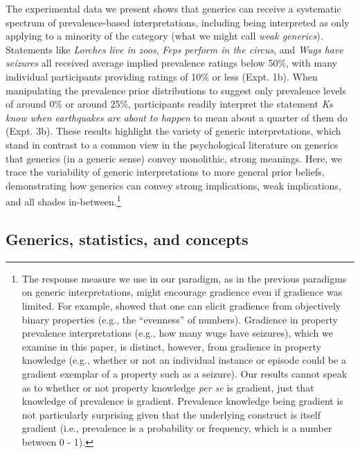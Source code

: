 \documentclass[floatsintext,man]{apa6}
\let\rmarkdownfootnote\footnote%
\def\footnote{\protect\rmarkdownfootnote}
\begin{document}
%
The experimental data we present shows that generics can receive a systematic spectrum of prevalence-based interpretations, including being interpreted as only applying to a minority of the category (what we might call \emph{weak generics}). 
Statements like \emph{Lorches live in zoos}, \emph{Feps perform in the circus}, and \emph{Wugs have seizures} all received average implied prevalence ratings below 50\%, with many individual participants providing ratings of 10\% or less (Expt. 1b).
When manipulating the prevalence prior distributions to suggest only prevalence levels of around 0\% or around 25\%, participants readily interpret the statement \emph{Ks know when earthquakes are about to happen} to mean about a quarter of them do (Expt. 3b).
These results highlight the variety of generic interpretations, which stand in contrast to a common view in the psychological literature on generics that generics (in a generic sense) convey monolithic, strong meanings.
Here, we trace the variability of generic interpretations to more general prior beliefs, demonstrating how generics can convey strong implications, weak implications, and all shades in-between.\footnote{
The response measure we use in our paradigm, as in the previous paradigms on generic interpretations, might encourage gradience even if gradience was limited.
For example,  showed that one can elicit gradience from objectively binary properties (e.g., the ``evenness'' of numbers).
Gradience in property prevalence interpretations (e.g., how many wugs have seizures), which we examine in this paper, is distinct, however, from gradience in property knowledge (e.g., whether or not an individual instance or episode could be a gradient exemplar of a property such as a seizure). Our results cannot speak as to whether or not property knowledge \emph{per se} is gradient, just that knowledge of prevalence is gradient. Prevalence knowledge being gradient is not particularly surprising given that the underlying construct is itself gradient (i.e., prevalence is a probability or frequency, which is a number between 0 - 1). 
}

\subsection{Generics, statistics, and concepts}
\end{document}
